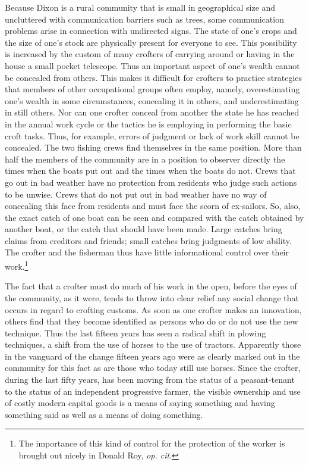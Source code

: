 \documentclass[openany,nobib]{tufte-book}
\begin{document}
Because Dixon is a rural community that is small in geographical size
and uncluttered with communication barriers such as trees, some
communication problems arise in connection with undirected signs. The
state of one's crops and the size of one's stock are physically present
for everyone to see. This possibility is increased by the custom of many
crofters of carrying around or having in the house a small pocket
telescope. Thus an important aspect of one's wealth cannot be concealed
from others. This makes it difficult for crofters to practice strategies
that members of other occupational groups often employ, namely,
overestimating one's wealth in some circumstances, concealing it in
others, and underestimating in still others. Nor can one crofter conceal
from another the state he has reached in the annual work cycle or the
tactics he is employing in performing the basic croft tasks. Thus, for
example, errors of judgment or lack of work skill cannot be concealed.
The two fishing crews find themselves in the same position. More than
half the members of the community are in a position to observer directly
the times when the boats put out and the times when the boats do not.
Crews that go out in bad weather have no protection from residents who
judge such actions to be unwise. Crews that do not put out in bad
weather have no way of concealing this face from residents and must face
the scorn of ex-sailors. So, also, the exact catch of one boat can be
seen and compared with the catch obtained by another boat, or the catch
that should have been made. Large catches bring claims from creditors
and friends; small catches bring judgments of low ability. The crofter
and the fisherman thus have little informational control over their
work.\footnote{The importance of this kind of control for the protection
  of the worker is brought out nicely in Donald Roy, \emph{op. cit}.}

The fact that a crofter must do much of his work in the open, before the
eyes of the community, as it were, tends to throw into clear relief any
social change that occurs in regard to crofting customs. As soon as one
crofter makes an innovation, others find that they become identified as
persons who do or do not use the new technique. Thus the last fifteen
years has seen a radical shift in plowing techniques, a shift from the
use of horses to the use of tractors. Apparently those in the vanguard
of the change fifteen years ago were as clearly marked out in the
community for this fact as are those who today still use horses. Since
the crofter, during the last fifty years, has been moving from the
status of a peasant-tenant to the status of an independent progressive
farmer, the visible ownership and use of costly modern capital goods is
a means of saying something and having something said as well as a means
of doing something.
\end{document}

